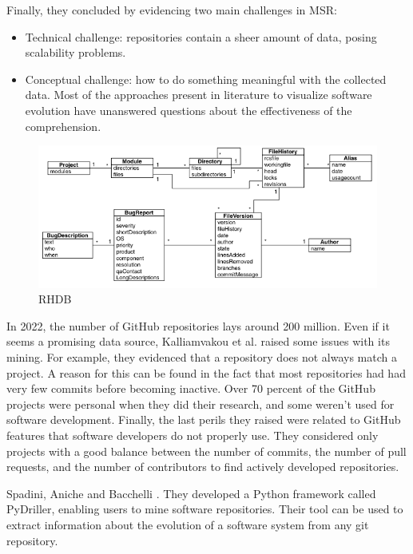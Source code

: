 Finally, they concluded by evidencing two main challenges in MSR:
\begin{itemize}
  \item Technical challenge: repositories contain a sheer amount of data, posing scalability problems. 
  \item Conceptual challenge: how to do something meaningful with the collected data. 
  Most of the approaches present in literature to visualize software evolution have unanswered questions about the effectiveness of the comprehension. 
\end{itemize}

\begin{figure}[H]
\centering
  \includegraphics[width=0.9\linewidth]{RHDB.png} 
  \caption{RHDB}
  \label{fig:RHDB}
\end{figure}
 


\bigbreak
In 2022, the number of GitHub repositories lays around 200 million.
Even if it seems a promising data source, Kalliamvakou et al. raised some issues with its mining. \cite{Kalliamvakou2014} 
For example, they evidenced that a repository does not always match a project. 
A reason for this can be found in the fact that most repositories had had very few commits before becoming inactive.
Over 70 percent of the GitHub projects were personal when they did their research, and some weren't used for software development. 
Finally, the last perils they raised were related to GitHub features that software developers do not properly use.
They considered only projects with a good balance between the number of commits, 
the number of pull requests, and the number of contributors to find actively developed repositories. 
 

\bigbreak
Spadini, Aniche and Bacchelli \cite{Spadini2018}. They developed a Python framework called PyDriller, enabling users to mine software repositories. 
Their tool can be used to extract information about the evolution of a software system from any git repository.  

